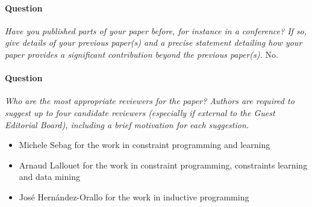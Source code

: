 \documentclass{article}
\begin{document}
\paragraph{Question} \textit{Have you published parts of your paper before, for instance in a conference? If so, give details of your previous paper(s) and a precise statement detailing how your paper provides a significant contribution beyond the previous paper(s).}
No.

\paragraph{Question} \textit{Who are the most appropriate reviewers for the paper? Authors are required to suggest up to four candidate reviewers (especially if external to the Guest Editorial Board), including a brief motivation for each suggestion.}
\begin{itemize}
  \item Michele Sebag for the work in constraint programming and learning
  \item Arnaud Lallouet for the work in constraint programming, constraints learning and data mining
  \item Jos\'e Hern\'andez-Orallo for the work in inductive programming
\end{itemize}
\end{document}
